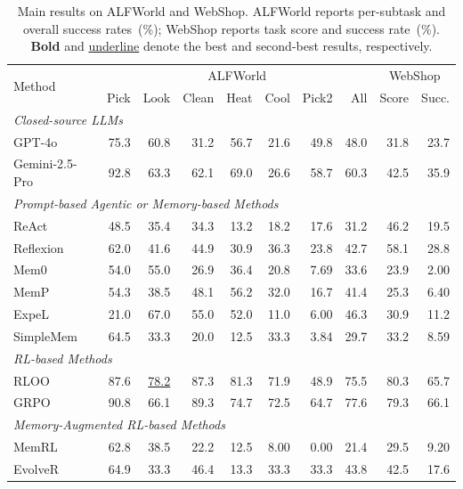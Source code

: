
\begin{table}[t]
    \caption{Main results on ALFWorld and WebShop. ALFWorld reports per-subtask and overall success rates~(\%); WebShop reports task score and success rate~(\%). \textbf{Bold} and \underline{underline} denote the best and second-best results, respectively.}
    \label{tab:main}
    \centering
    \small
    \setlength{\tabcolsep}{4pt}
    \begin{tabular}{lrrrrrrr|rr}
    \toprule
    \multirow{2}{*}{Method} & \multicolumn{7}{c|}{ALFWorld} & \multicolumn{2}{c}{WebShop} \\
     & Pick & Look & Clean & Heat & Cool & Pick2 & All & Score & Succ. \\
    \midrule
    \multicolumn{10}{l}{\textit{Closed-source LLMs}} \\
    GPT-4o          & 75.3 & 60.8 & 31.2 & 56.7 & 21.6 & 49.8 & 48.0 & 31.8 & 23.7 \\
    Gemini-2.5-Pro  & 92.8 & 63.3 & 62.1 & 69.0 & 26.6 & 58.7 & 60.3 & 42.5 & 35.9 \\
    \midrule
    \multicolumn{10}{l}{\textit{Prompt-based Agentic or Memory-based Methods}} \\
    ReAct     & 48.5 & 35.4 & 34.3 & 13.2 & 18.2 & 17.6 & 31.2 & 46.2 & 19.5 \\
    Reflexion  & 62.0 & 41.6 & 44.9 & 30.9 & 36.3 & 23.8 & 42.7 & 58.1 & 28.8 \\
    Mem0            & 54.0 & 55.0 & 26.9 & 36.4 & 20.8 & 7.69 & 33.6 & 23.9 & 2.00 \\
    MemP            & 54.3 & 38.5 & 48.1 & 56.2 & 32.0 & 16.7 & 41.4 & 25.3 & 6.40 \\
    ExpeL           & 21.0 & 67.0 & 55.0 & 52.0 & 11.0 & 6.00 & 46.3 & 30.9 & 11.2 \\
    SimpleMem       & 64.5 & 33.3 & 20.0 & 12.5 & 33.3 & 3.84 & 29.7 & 33.2 & 8.59 \\
    \midrule
    \multicolumn{10}{l}{\textit{RL-based Methods}} \\
    RLOO       & 87.6 & \underline{78.2} & 87.3 & 81.3 & 71.9 & 48.9 & 75.5 & 80.3 & 65.7 \\
    GRPO       & 90.8 & 66.1 & 89.3 & 74.7 & 72.5 & 64.7 & 77.6 & 79.3 & 66.1 \\
    \midrule
    \multicolumn{10}{l}{\textit{Memory-Augmented RL-based Methods}} \\
    MemRL           & 62.8 & 38.5 & 22.2 & 12.5 &  8.00 &  0.00 & 21.4 & 29.5 &  9.20 \\
    EvolveR         & 64.9 & 33.3 & 46.4 & 13.3 & 33.3 & 33.3 & 43.8 & 42.5 & 17.6 \\

\end{tabular}
\end{table}
